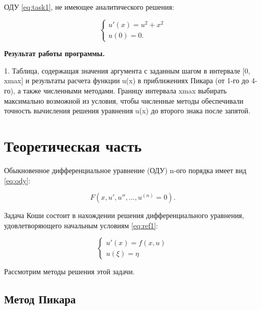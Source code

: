 \documentclass[12pt]{report}
\begin{document}
ОДУ \ref{eq:task1}, не имеющее аналитического решения:

\begin{equation}
	{\begin{cases}
			u'(x) = u^2 + x^2 \\
			u(0) = 0.
	\end{cases}}
	\label{eq:task1}
\end{equation}

\textbf{Результат работы программы.}

1. Таблица, содержащая значения аргумента с заданным шагом в интервале [0, xmax] и результаты расчета функции u(x) в приближениях Пикара (от 1-го до 4-го), а также численными методами. Границу интервала xmax выбирать максимально возможной из условия, чтобы численные методы обеспечивали точность вычисления решения уравнения u(x) до второго знака после запятой.

\chapter{Теоретическая часть}

Обыкновенное дифференциальное уравнение (ОДУ) n-ого порядка имеет вид \ref{eq:ody}:

\begin{equation}
	F(x, u', u'', ... , u^{(n)} = 0)
	\label{eq:ody}.
\end{equation}

Задача Коши состоит в нахождении решения дифференциального уравнения, удовлетворяющего начальным условиям \ref{eq:ref1}:


\begin{equation}
	{\begin{cases}
			u'(x) = f(x,u) \\
			u(\xi) = \eta
	\end{cases}}
	\label{eq:ref1}
\end{equation}

Рассмотрим методы решения этой задачи.



\section{Метод Пикара}
\end{document}
